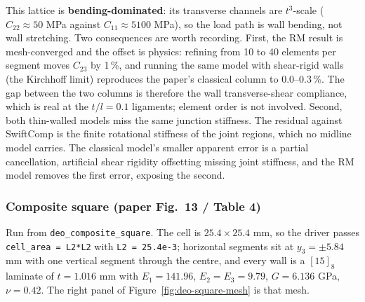 This lattice is \textbf{bending-dominated}: its transverse channels are
$t^3$-scale ($C_{22}\approx 50$ MPa against $C_{11}\approx 5100$ MPa), so the
load path is wall bending, not wall stretching. Two consequences are worth
recording. First, the RM result is mesh-converged and the offset is physics:
refining from 10 to 40 elements per segment moves $C_{23}$ by 1\,\%, and running
the same model with shear-rigid walls (the Kirchhoff limit) reproduces the
paper's classical column to 0.0--0.3\,\%. The gap between the two columns is
therefore the wall transverse-shear compliance, which is real at the $t/l = 0.1$
ligaments; element order is not involved. Second, both thin-walled models miss
the same junction stiffness. The residual against SwiftComp is the finite
rotational stiffness of the joint regions, which no midline model carries. The
classical model's smaller apparent error is a partial cancellation, artificial
shear rigidity offsetting missing joint stiffness, and the RM model removes the
first error, exposing the second.

\subsubsection{Composite square (paper Fig.~13 / Table 4)}

Run from \texttt{deo\_composite\_square}. The cell is $25.4\times25.4$ mm, so the
driver passes \texttt{cell\_area = L2*L2} with \texttt{L2 = 25.4e-3}; horizontal
segments sit at $y_3=\pm5.84$ mm with one vertical segment through the centre,
and every wall is a $[15]_8$ laminate of $t = 1.016$ mm with $E_1 = 141.96$,
$E_2 = E_3 = 9.79$, $G = 6.136$ GPa, $\nu = 0.42$. The right panel of
Figure~\ref{fig:deo-square-mesh} is that mesh.

